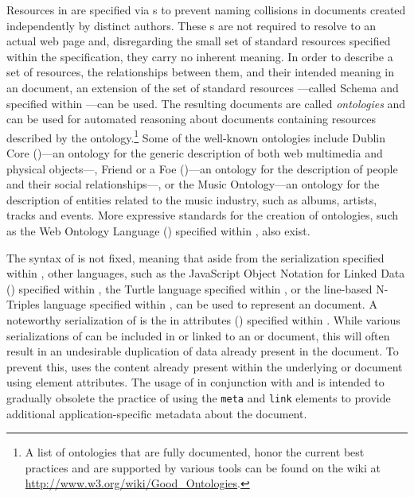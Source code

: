 \documentclass{book}
\begin{document}
        Resources in  are specified via s to prevent
        naming collisions in  documents created independently by
        distinct authors. These s are not required to resolve to an
        actual web page and, disregarding the small set of standard resources
        specified within the  specification, they carry no
        inherent meaning.  In order to describe a set of resources, the
        relationships between them, and their intended meaning in an
         document, an extension of the set of standard resources%
        ---called  Schema and specified within
        \cite{brickley04}---can be used.  The resulting documents are called
        \emph{ontologies} and can be used for automated reasoning about
         documents containing resources described by the
        ontology.\footnote{
          A list of ontologies that are fully documented, honor the current best
          practices and are supported by various tools can be found on the
           wiki at \url{http://www.w3.org/wiki/Good_Ontologies}.
        } Some of the well-known ontologies include Dublin
        Core ()---an ontology for the generic description of both
        web multimedia and physical objects---, Friend or a Foe
        ()---an ontology for the description of people and their
        social relationships---, or the Music Ontology---an ontology for the
        description of entities related to the music industry, such as albums,
        artists, tracks and events. More expressive standards for the creation
        of ontologies, such as the Web Ontology Language ()
        specified within \cite{mcguinness04}, also exist.

        The syntax of  is not fixed, meaning that aside from the
         serialization specified within \cite{lassira99}, other
        languages, such as the JavaScript Object Notation for Linked Data
        () specified within \cite{sporny14}, the Turtle
        language specified within \cite{beckett14-turtle}, or the line-based
        N-Triples language specified within \cite{beckett14-nt}, can be used to
        represent an  document. A noteworthy serialization of
         is the  in attributes ()
        specified within \cite{adida08}. While various serializations of
         can be included in or linked to an  or
         document, this will often result in an undesirable
        duplication of data already present in the document. To prevent this,
         uses the content already present within the underlying
         or  document using element attributes. The
        usage of  in conjunction with  and
         is intended to gradually obsolete the practice of using
        the \texttt{meta} and \texttt{link} elements to provide additional
        application-specific metadata about the document.
\end{document}
